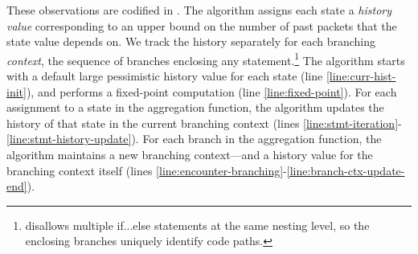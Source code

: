 
These observations are codified in . The algorithm
assigns each state a {\em history value} corresponding to an upper bound on the
number of past packets that the state value depends on. We track the history
separately for each branching {\em context}, \ie the sequence of branches
enclosing any statement.\footnote{\TheSystem disallows multiple {\ct if...else}
  statements at the same nesting level, so the enclosing branches uniquely
  identify code paths.} The algorithm starts with a default large pessimistic
history value for each state (line \ref{line:curr-hist-init}), and performs a
fixed-point computation (line \ref{line:fixed-point}).
For each assignment to a state in the aggregation function, the algorithm
updates the history of that state in the current branching context (lines
\ref{line:stmt-iteration}-\ref{line:stmt-history-update}). For each branch in
the aggregation function, the algorithm maintains a new branching context---and
a history value for the branching context itself
(lines \ref{line:encounter-branching}-\ref{line:branch-ctx-update-end}).
  
